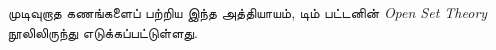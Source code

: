\documentclass[../../../include/open-logic-chapter]{subfiles}
\begin{document}

\begin{editorial}
முடிவுறாத கணங்களைப் பற்றிய இந்த அத்தியாயம்,
டிம் பட்டனின் \emph{Open Set Theory} நூலிலிருந்து எடுக்கப்பட்டுள்ளது.
\end{editorial}

\end{document}

